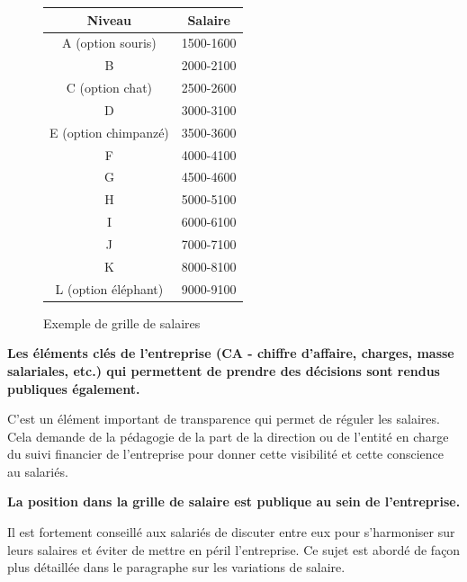 \documentclass[12pt]{article}
\newcommand{\regle}[1]{%
  \begin{tcolorbox}[colframe=DarkOrange,boxrule=2pt,arc=4pt,left=6pt,right=6pt,top=6pt,bottom=6pt,boxsep=0pt,colback=LightOrange]
  \textbf{#1}
  \end{tcolorbox}
}
\begin{document}
\begin{figure}
  \begin{center}
  \begin{tabular}{| c | c |}
    \hline
    Niveau & Salaire \\ 
    \hline
    A (option souris) & 1500-1600 \\
    \hline
    B & 2000-2100 \\
    \hline
    C (option chat) & 2500-2600 \\
    \hline
    D & 3000-3100 \\
    \hline
    E (option chimpanzé) & 3500-3600 \\
    \hline
    F & 4000-4100 \\
    \hline
    G & 4500-4600 \\
    \hline
    H & 5000-5100 \\
    \hline
    I & 6000-6100 \\
    \hline
    J & 7000-7100 \\
    \hline
    K & 8000-8100 \\
    \hline
    L (option éléphant) & 9000-9100 \\
    \hline
  \end{tabular}
  \end{center}
  \caption{Exemple de grille de salaires}
  \label{grille}
\end{figure}

\regle{Les éléments clés de l’entreprise (CA - chiffre d’affaire, charges, masse salariales, etc.) qui permettent de prendre des décisions sont rendus publiques également.}

 C’est un élément important de transparence qui permet de réguler les salaires. Cela demande de la pédagogie de la part de la direction ou de l’entité en charge du suivi financier de l’entreprise pour donner cette visibilité et cette conscience au salariés.

 \regle{La position dans la grille de salaire est publique au sein de l’entreprise.}

 Il est fortement conseillé aux salariés de discuter entre eux pour s’harmoniser sur leurs salaires et éviter de mettre en péril l’entreprise. Ce sujet est abordé de façon plus détaillée dans le paragraphe sur les variations de salaire.
\end{document}
